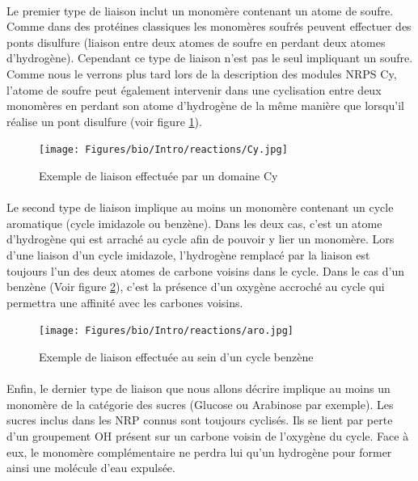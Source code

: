 \documentclass[12pt,french,twoside]{report}
\begin{document}
\paragraph{}Le premier type de liaison inclut un monomère contenant un atome de soufre.
Comme dans des protéines classiques les monomères soufrés peuvent effectuer des ponts disulfure (liaison entre deux atomes de soufre en perdant deux atomes d'hydrogène).
Cependant ce type de liaison n'est pas le seul impliquant un soufre.
Comme nous le verrons plus tard lors de la description des modules NRPS Cy, l'atome de soufre peut également intervenir dans une cyclisation entre deux monomères en perdant son atome d'hydrogène de la même manière que lorsqu'il réalise un pont disulfure (voir figure \ref{Cy_link}).

\begin{figure}[h!]
  \begin{center}
    \texttt{[image: Figures/bio/Intro/reactions/Cy.jpg]}
    \caption{\label{Cy_link}Exemple de liaison effectuée par un domaine Cy}
  \end{center}
\end{figure}

\paragraph{}Le second type de liaison implique au moins un monomère contenant un cycle aromatique (cycle imidazole ou benzène).
Dans les deux cas, c'est un atome d'hydrogène qui est arraché au cycle afin de pouvoir y lier un monomère.
Lors d'une liaison d'un cycle imidazole, l'hydrogène remplacé par la liaison est toujours l'un des deux atomes de carbone voisins dans le cycle.
Dans le cas d'un benzène (Voir figure \ref{benzene}), c'est la présence d'un oxygène accroché au cycle qui permettra une affinité avec les carbones voisins.

\begin{figure}[h!]
  \begin{center}
    \texttt{[image: Figures/bio/Intro/reactions/aro.jpg]}
    \caption{\label{benzene}Exemple de liaison effectuée au sein d'un cycle benzène}
  \end{center}
\end{figure}

\paragraph{}Enfin, le dernier type de liaison que nous allons décrire implique au moins un monomère de la catégorie des sucres (Glucose ou Arabinose par exemple).
Les sucres inclus dans les NRP connus sont toujours cyclisés.
Ils se lient par perte d'un groupement OH présent sur un carbone voisin de l'oxygène du cycle.
Face à eux, le monomère complémentaire ne perdra lui qu'un hydrogène pour former ainsi une molécule d'eau expulsée.
\end{document}
